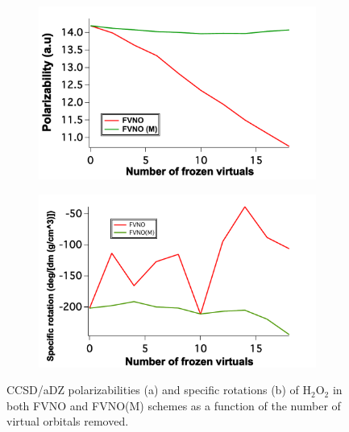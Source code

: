 \begin{figure}
\begin{subfigure}{.5\textwidth}
  \centering
  \includegraphics[width=.9\linewidth]{figures_fvno++/fvno(m)_h2o2_adz_polar.pdf}
  \caption{}
  \label{fig:sfig1}
\end{subfigure}%
\begin{subfigure}{.5\textwidth}
  \centering
  \includegraphics[width=.9\linewidth]{figures_fvno++/fvno(m)_h2o2_adz_optrot.pdf}
  \caption{}
  \label{fig:sfig2}
\end{subfigure}
\caption{{\footnotesize CCSD/aDZ polarizabilities (a) and specific rotations (b) of H$_2$O$_2$ in both FVNO and FVNO(M) schemes as a function of
the number of virtual orbitals removed.}}
\label{fig:fvno(m)_h2o2_adz_polar_optrot}
\end{figure}
